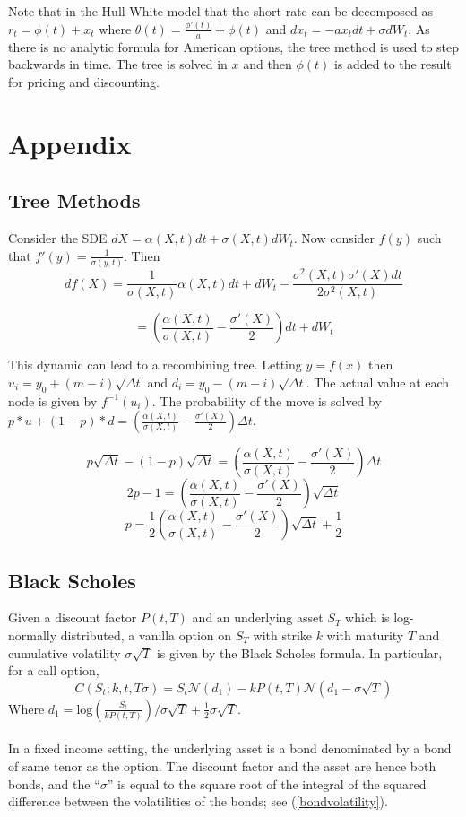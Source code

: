 \documentclass{article}
\theoremstyle{definition}
\begin{document}
Note that in the Hull-White model that the short rate can be decomposed as \(r_t=\phi(t)+x_t\) where \(\theta(t)=\frac{\phi'(t)}{a}+\phi(t)\) and \(dx_t=-ax_t dt+\sigma dW_t\).  As there is no analytic formula for American options, the tree method is used to step backwards in time.  The tree is solved in \(x\) and then \(\phi(t)\) is added to the result for pricing and discounting.  

\section{Appendix}

\subsection{Tree Methods} \label{tree}
Consider the SDE \(dX=\alpha(X, t)dt+\sigma(X, t)dW_t\).  Now consider \(f(y)\) such that \(f'(y)=\frac{1}{\sigma(y, t)}\).  Then \[df(X)=\frac{1}{\sigma(X, t)} \alpha(X, t)dt+dW_t-\frac{\sigma^2(X, t)\sigma'(X)dt}{2\sigma^2(X, t)}\]

\[=\left(\frac{\alpha(X, t)}{\sigma(X, t)}-\frac{\sigma'(X)}{2}\right)dt+dW_t\]
 
 This dynamic can lead to a recombining tree.  Letting \(y=f(x)\) then \(u_i=y_0+(m-i)\sqrt{\Delta t}\) and \(d_i=y_0-(m-i)\sqrt{\Delta t}\).  The actual value at each node is given by \(f^{-1}(u_i)\). The probability of the move is solved by \(p*u+(1-p)*d=\left(\frac{\alpha(X, t)}{\sigma(X, t)}-\frac{\sigma'(X)}{2}\right)\Delta t\). 
 
 \[p\sqrt{\Delta t}-(1-p)\sqrt{\Delta t}=\left(\frac{\alpha(X, t)}{\sigma(X, t)}-\frac{\sigma'(X)}{2}\right)\Delta t\]
  \[2p-1=\left(\frac{\alpha(X, t)}{\sigma(X, t)}-\frac{\sigma'(X)}{2}\right)\sqrt{\Delta t}\]
  \[p=\frac{1}{2}\left(\frac{\alpha(X, t)}{\sigma(X, t)}-\frac{\sigma'(X)}{2}\right)\sqrt{\Delta t}+\frac{1}{2}\]
  
\subsection{Black Scholes} \label{BS}
  Given a discount factor \(P(t, T)\) and an underlying asset \(S_T\) which is log-normally distributed, a vanilla option on \(S_T\) with strike \(k\) with maturity \(T\) and cumulative volatility \(\sigma \sqrt{T}\) is given by the Black Scholes formula.  In particular, for a call option,
  \[C(S_t; k, t, T \sigma)=S_t \mathcal{N}(d_1)-kP(t, T)\mathcal{N}(d_1-\sigma \sqrt{T})\]
  Where \(d_1=\mathrm{log}\left(\frac{S_t}{kP(t, T)}\right)/\sigma \sqrt{T}+\frac{1}{2}\sigma \sqrt{T}\).
  \\
  \\
  In a fixed income setting, the underlying asset is a bond denominated by a bond of same tenor as the option.  The discount factor and the asset are hence both bonds, and the ``\(\sigma\)'' is equal to the square root of the integral of the squared difference between the volatilities of the bonds; see (\ref{bondvolatility}). 
  
\end{document}
